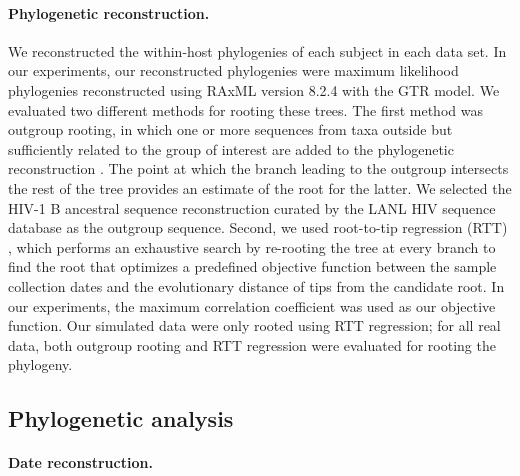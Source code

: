\documentclass{bmcart}
\begin{document}
\paragraph {Phylogenetic reconstruction.} \label{subsec:phylo}
We reconstructed the within-host phylogenies of each subject in each data set.
In our experiments, our reconstructed phylogenies were maximum likelihood phylogenies reconstructed using RAxML version 8.2.4 \cite{Raxml14} with the GTR model.
We evaluated two different methods for rooting these trees. 
The first method was outgroup rooting, in which one or more sequences from taxa outside but sufficiently related to the group of interest are added to the phylogenetic reconstruction \cite{Huelsenbeck02}.
The point at which the branch leading to the outgroup intersects the rest of the tree provides an estimate of the root for the latter.
We selected the HIV-1 B ancestral sequence reconstruction curated by the LANL HIV sequence database \cite{LosAlamos} as the outgroup sequence.
Second, we used root-to-tip regression (RTT) \cite{Korber00}, which performs an exhaustive search by re-rooting the tree at every branch to find the root that optimizes a predefined objective function between the sample collection dates and the evolutionary distance of tips from the candidate root.
In our experiments, the maximum correlation coefficient was used as our objective function.
Our simulated data were only rooted using RTT regression; for all real data, both outgroup rooting and RTT regression were evaluated for rooting the phylogeny.


\subsection * {Phylogenetic analysis}

\paragraph * {Date reconstruction.} \label{subsec:daterecon}
\end{document}
